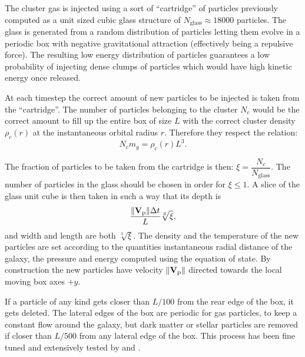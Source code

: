 The cluster gas is injected using a sort of ``cartridge'' of particles previously computed as a unit sized cubic glass structure of $N_{\text{glass}} \approx 18000$ particles.
The glass is generated from a random distribution of particles letting them evolve in a periodic box with negative gravitational attraction (effectively being a repulsive force).
The resulting low energy distribution of particles guarantees a low probability of injecting dense clumps of particles which would have high kinetic energy once released.

At each timestep the correct amount of new particles to be injected is taken from the ``cartridge''.
The number of particles belonging to the cluster $N_c$ would be the correct amount to fill up the entire box of size $L$ with the correct cluster density $\rho_c(r)$ at the instantaneous orbital radius $r$.
Therefore they respect the relation:
\begin{equation}
 N_c m_g = \rho_c(r) L^3.
\end{equation}

The fraction of particles to be taken from the cartridge is then: $\xi=\dfrac{N_c}{N_{\text{glass}}}$. The number of particles in the glass should be chosen in order for $\xi\leq1$.
A slice of the glass unit cube is then taken in such a way that its depth is
\begin{equation}
\frac{\norm{\boldsymbol{\mathbf{V}}_{\mathrm p}}\Delta t}{L} \sqrt[3]{\xi},
\end{equation}
and width and length are both $\sqrt[3]{\xi}$. The density and the temperature of the new particles are set according to the quantities instantaneous radial distance of the galaxy, the pressure and energy computed using the equation of state.
By construction the new particles have velocity $\norm{\boldsymbol{\mathbf{V}}_{\mathrm p}}$ directed towards the local moving box axes $+y$.

If a particle of any kind gets closer than $L/100$ from the rear edge of the box, it gets deleted.
The lateral edges of the box are periodic for gas particles, to keep a constant flow around the galaxy, but dark matter or stellar particles are removed if closer than $L/500$ from any lateral edge of the box.
This process has been fine tuned and extensively tested by \citet{Nichols2015} and \citet{Hausammann2019}.


